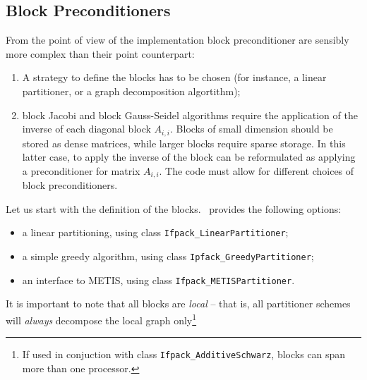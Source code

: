 \subsection{Block Preconditioners}
\label{sec:block_ex}

From the point of view of the implementation block preconditioner
are sensibly more complex than their point counterpart:
\begin{enumerate}
\item A strategy to define the blocks has to be chosen (for instance, 
a linear partitioner, or a graph decomposition algortithm);
\item block Jacobi and block Gauss-Seidel algorithms require the application
of the inverse of each diagonal block $A_{i,i}$. Blocks of small dimension
should be stored as dense matrices, while larger blocks require sparse
storage. In this latter case, to apply the inverse of the block can be
reformulated as applying a preconditioner for matrix
$A_{i,i}$.
The code must allow for different choices of block preconditioners.
\end{enumerate}

\smallskip

Let us start with the definition of the blocks. 
\ifpack\ provides the following options:
\begin{itemize}
\item a linear partitioning, using class \verb!Ifpack_LinearPartitioner!;
\item a simple greedy algorithm, using class \verb!Ipfack_GreedyPartitioner!;
\item an interface to METIS, using class \verb!Ifpack_METISPartitioner!.
\end{itemize}
It is important to note that all blocks are {\sl local} -- that is, 
  all partitioner schemes will {\sl always} decompose the local graph 
  only\footnote{If used in conjuction with class {\tt Ifpack\_AdditiveSchwarz},
    blocks can span more than one processor. }

